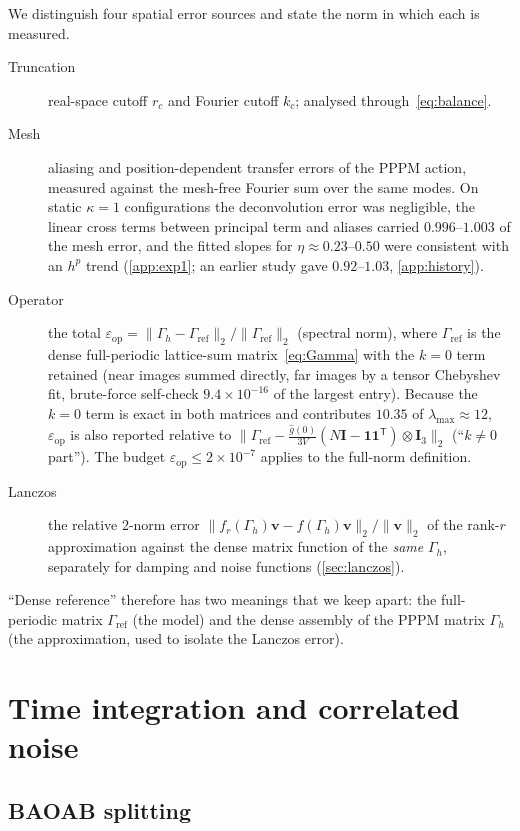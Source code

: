 \documentclass[11pt]{article}
\DeclareRobustCommand{\_}{\textunderscore\allowbreak}
\theoremstyle{remark}
\theoremstyle{definition}
\newcommand{\bv}{\mathbf{v}}
\newcommand{\Id}{\mathbf{I}}
\newcommand{\one}{\mathbf{1}}
\newcommand{\Gref}{\Gamma_{\mathrm{ref}}}
\newcommand{\Gh}{\Gamma_h}
\newcommand{\eop}{\varepsilon_{\mathrm{op}}}
\begin{document}
We distinguish four spatial error sources and state the norm in which each is measured.
\begin{description}
\item[Truncation] real-space cutoff $r_c$ and Fourier cutoff $k_c$; analysed through~\eqref{eq:balance}.
\item[Mesh] aliasing and position-dependent transfer errors of the PPPM action, measured against the mesh-free Fourier
sum over the same modes. On static $\kappa=1$ configurations the deconvolution error was negligible, the linear cross terms
between principal term and aliases carried $0.996$--$1.003$ of the mesh error, and the fitted slopes for
$\eta\approx0.23$--$0.50$ were consistent with an $h^p$ trend (\cref{app:exp1}; an earlier study gave $0.92$--$1.03$, \cref{app:history}).
\item[Operator] the total $\eop=\|\Gh-\Gref\|_2/\|\Gref\|_2$ (spectral norm), where $\Gref$ is the dense full-periodic
lattice-sum matrix~\eqref{eq:Gamma} with the $k=0$ term retained (near images summed directly, far images by a
tensor Chebyshev fit, brute-force self-check $9.4\times10^{-16}$ of the largest entry). Because the $k=0$ term is
exact in both matrices and contributes $10.35$ of $\lambda_{\max}\approx12$, $\eop$ is also reported relative to
$\|\Gref-\frac{\hat g(0)}{3V}(N\Id-\one\one^{\mathsf T})\otimes\Id_3\|_2$ (``$k\neq0$ part'').
The budget $\eop\le2\times10^{-7}$ applies to the full-norm definition.
\item[Lanczos] the relative 2-norm error $\|f_r(\Gh)\bv-f(\Gh)\bv\|_2/\|\bv\|_2$ of the rank-$r$ approximation against
the dense matrix function of the \emph{same} $\Gh$, separately for damping and noise functions
(\cref{sec:lanczos}).
\end{description}
``Dense reference'' therefore has two meanings that we keep apart: the full-periodic matrix $\Gref$ (the model) and the
dense assembly of the PPPM matrix $\Gh$ (the approximation, used to isolate the Lanczos error).

\section{Time integration and correlated noise}\label{sec:time}

\subsection{BAOAB splitting}
\end{document}

